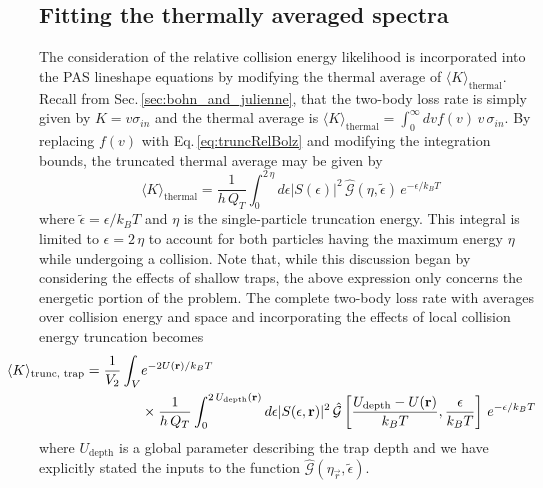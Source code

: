 \subsection{Fitting the thermally averaged spectra} \label{sec:lowIntSpectra}
The consideration of the relative collision energy likelihood is incorporated into the PAS lineshape equations by modifying the thermal average of $\langle K \rangle_\text{thermal}$.
Recall from Sec.\,\ref{sec:bohn_and_julienne}, that the two-body loss rate is simply given by $K= v \sigma_{in}$ and the thermal average is $\langle K \rangle_{\text{thermal}} = \int_0^{\infty} dv f(v)\,v\,\sigma_{in}$.
By replacing $f(v)$ with Eq.\,\ref{eq:truncRelBolz} and modifying the integration bounds, the truncated thermal average may be given by
\begin{equation}
	\langle K \rangle_\text{thermal} = \frac{1}{h\,Q_{T}} \int_{0}^{2\,\eta} d\epsilon \vert S(\epsilon) \vert^2 \, \hat{\mathcal{G}}(\eta, \tilde{\epsilon})\,e^{-\epsilon/k_{B}T}
\end{equation}
where $\tilde{\epsilon} = \epsilon/k_{B}T$ and $\eta$ is the single-particle truncation energy.
This integral is limited to $\epsilon = 2\,\eta$ to account for both particles having the maximum energy $\eta$ while undergoing a collision.
Note that, while this discussion began by considering the effects of shallow traps, the above expression only concerns the energetic portion of the problem.
The complete two-body loss rate with averages over collision energy and space and incorporating the effects of local collision energy truncation becomes
\begin{align} \label{eq:chap5avgTruncK}
\hspace*{-1cm} 
	\langle K \rangle_\text{trunc, trap} = \frac{1}{V_2} \int_V &e^{-2 U(\vec{r})/k_{B}T} \\ 
	\nonumber
	&\times \frac{1}{h\,Q_{T}} \int_{0}^{2\,U_{\text{depth}}(\vec{r})} d\epsilon \vert S(\epsilon, \vec{r}) \vert^2 \,\hat{\mathcal{G}} \left[\frac{U_\text{depth}-U(\vec{r})}{k_B T}, \frac{\epsilon}{k_{B}T}  \right]  \,e^{-\epsilon/k_{B}T}
\end{align}
where $U_\text{depth}$ is a global parameter describing the trap depth and we have explicitly stated the inputs to the function $\hat{\mathcal{G}}(\eta_{\vec{r}}, \tilde{\epsilon})$.

